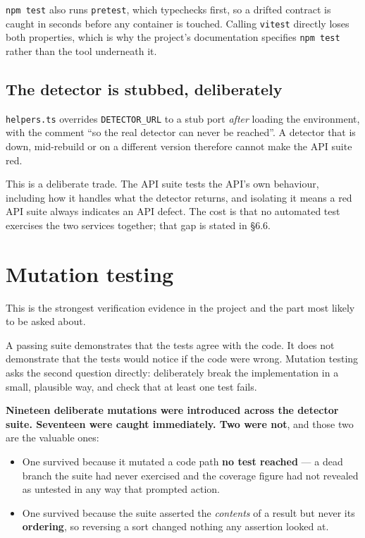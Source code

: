 \texttt{npm\ test} also runs \texttt{pretest}, which typechecks first,
so a drifted contract is caught in seconds before any container is
touched. Calling \texttt{vitest} directly loses both properties, which
is why the project's documentation specifies \texttt{npm\ test} rather
than the tool underneath it.

\hypertarget{the-detector-is-stubbed-deliberately}{%
\subsection{The detector is stubbed,
deliberately}\label{the-detector-is-stubbed-deliberately}}

\texttt{helpers.ts} overrides \texttt{DETECTOR\_URL} to a stub port
\emph{after} loading the environment, with the comment ``so the real
detector can never be reached''. A detector that is down, mid-rebuild or
on a different version therefore cannot make the API suite red.

This is a deliberate trade. The API suite tests the API's own behaviour,
including how it handles what the detector returns, and isolating it
means a red API suite always indicates an API defect. The cost is that
no automated test exercises the two services together; that gap is
stated in \S{}6.6.

\hypertarget{mutation-testing}{%
\section{Mutation testing}\label{mutation-testing}}

This is the strongest verification evidence in the project and the part
most likely to be asked about.

A passing suite demonstrates that the tests agree with the code. It does
not demonstrate that the tests would notice if the code were wrong.
Mutation testing asks the second question directly: deliberately break
the implementation in a small, plausible way, and check that at least
one test fails.

\textbf{Nineteen deliberate mutations were introduced across the
detector suite. Seventeen were caught immediately. Two were not}, and
those two are the valuable ones:

\begin{itemize}
\tightlist
\item
  One survived because it mutated a code path \textbf{no test reached}
  --- a dead branch the suite had never exercised and the coverage
  figure had not revealed as untested in any way that prompted action.
\item
  One survived because the suite asserted the \emph{contents} of a
  result but never its \textbf{ordering}, so reversing a sort changed
  nothing any assertion looked at.
\end{itemize}

